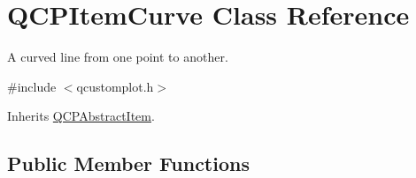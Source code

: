\hypertarget{class_q_c_p_item_curve}{\section{Q\-C\-P\-Item\-Curve Class Reference}
\label{class_q_c_p_item_curve}
}


A curved line from one point to another.  




{\ttfamily \#include $<$qcustomplot.\-h$>$}



Inherits \hyperlink{class_q_c_p_abstract_item}{Q\-C\-P\-Abstract\-Item}.

\subsection*{Public Member Functions}
